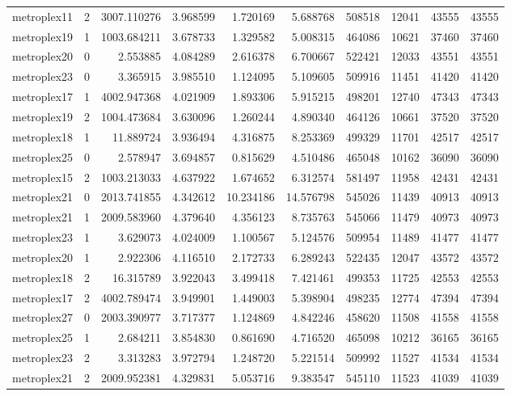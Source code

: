 \documentclass[../../../thesis.tex]{subfiles}
\begin{document}
\begin{longtable}{|l|r|r|r|r|r|r|r|r|r|}
metroplex11 & 2 & 3007.110276 & 3.968599 & 1.720169 & 5.688768 & 508518 & 12041 & 43555 & 43555 \\
metroplex19 & 1 & 1003.684211 & 3.678733 & 1.329582 & 5.008315 & 464086 & 10621 & 37460 & 37460 \\
metroplex20 & 0 & 2.553885 & 4.084289 & 2.616378 & 6.700667 & 522421 & 12033 & 43551 & 43551 \\
metroplex23 & 0 & 3.365915 & 3.985510 & 1.124095 & 5.109605 & 509916 & 11451 & 41420 & 41420 \\
metroplex17 & 1 & 4002.947368 & 4.021909 & 1.893306 & 5.915215 & 498201 & 12740 & 47343 & 47343 \\
metroplex19 & 2 & 1004.473684 & 3.630096 & 1.260244 & 4.890340 & 464126 & 10661 & 37520 & 37520 \\
metroplex18 & 1 & 11.889724 & 3.936494 & 4.316875 & 8.253369 & 499329 & 11701 & 42517 & 42517 \\
metroplex25 & 0 & 2.578947 & 3.694857 & 0.815629 & 4.510486 & 465048 & 10162 & 36090 & 36090 \\
metroplex15 & 2 & 1003.213033 & 4.637922 & 1.674652 & 6.312574 & 581497 & 11958 & 42431 & 42431 \\
metroplex21 & 0 & 2013.741855 & 4.342612 & 10.234186 & 14.576798 & 545026 & 11439 & 40913 & 40913 \\
metroplex21 & 1 & 2009.583960 & 4.379640 & 4.356123 & 8.735763 & 545066 & 11479 & 40973 & 40973 \\
metroplex23 & 1 & 3.629073 & 4.024009 & 1.100567 & 5.124576 & 509954 & 11489 & 41477 & 41477 \\
metroplex20 & 1 & 2.922306 & 4.116510 & 2.172733 & 6.289243 & 522435 & 12047 & 43572 & 43572 \\
metroplex18 & 2 & 16.315789 & 3.922043 & 3.499418 & 7.421461 & 499353 & 11725 & 42553 & 42553 \\
metroplex17 & 2 & 4002.789474 & 3.949901 & 1.449003 & 5.398904 & 498235 & 12774 & 47394 & 47394 \\
metroplex27 & 0 & 2003.390977 & 3.717377 & 1.124869 & 4.842246 & 458620 & 11508 & 41558 & 41558 \\
metroplex25 & 1 & 2.684211 & 3.854830 & 0.861690 & 4.716520 & 465098 & 10212 & 36165 & 36165 \\
metroplex23 & 2 & 3.313283 & 3.972794 & 1.248720 & 5.221514 & 509992 & 11527 & 41534 & 41534 \\
metroplex21 & 2 & 2009.952381 & 4.329831 & 5.053716 & 9.383547 & 545110 & 11523 & 41039 & 41039 \\

\end{longtable}
\end{document}
